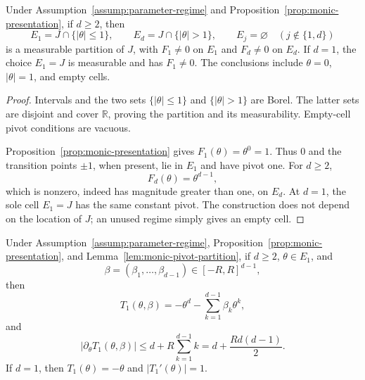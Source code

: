 \begin{lemma}
\label{lem:monic-pivot-partition}
Under Assumption~\ref{assump:parameter-regime} and
Proposition~\ref{prop:monic-presentation}, if $d\geq2$, then
\begin{equation}
E_1=J\cap\{|\theta|\leq1\},
\qquad
E_d=J\cap\{|\theta|>1\},
\qquad
E_j=\varnothing\quad(j\notin\{1,d\})
\label{eq:appendix-46}
\end{equation}
is a measurable partition of $J$, with $F_1\neq0$ on $E_1$ and
$F_d\neq0$ on $E_d$.  If $d=1$, the choice $E_1=J$ is measurable and has
$F_1\neq0$.  The conclusions include $\theta=0$, $|\theta|=1$, and empty
cells.
\end{lemma}

\begin{proof}
Intervals and the two sets $\{|\theta|\leq1\}$ and
$\{|\theta|>1\}$ are Borel.  The latter sets are disjoint and cover
$\mathbb R$, proving the partition and its measurability.  Empty-cell pivot
conditions are vacuous.

Proposition~\ref{prop:monic-presentation} gives
$F_1(\theta)=\theta^0=1$.  Thus $0$ and the transition points $\pm1$, when
present, lie in $E_1$ and have pivot one.  For $d\geq2$,
\[
F_d(\theta)=\theta^{d-1},
\]
which is nonzero, indeed has magnitude greater than one, on $E_d$.  At
$d=1$, the sole cell $E_1=J$ has the same constant pivot.  The construction
does not depend on the location of $J$; an unused regime simply gives an
empty cell.
\end{proof}

\begin{lemma}
\label{lem:monic-low-chart}
Under Assumption~\ref{assump:parameter-regime},
Proposition~\ref{prop:monic-presentation}, and
Lemma~\ref{lem:monic-pivot-partition}, if $d\geq2$,
$\theta\in E_1$, and
\[
\beta=(\beta_1,\ldots,\beta_{d-1})\in[-R,R]^{d-1},
\]
then
\begin{equation}
T_1(\theta,\beta)
=-\theta^d-\sum_{k=1}^{d-1}\beta_k\theta^k,
\label{eq:appendix-47}
\end{equation}
and
\begin{equation}
|\partial_\theta T_1(\theta,\beta)|
\leq d+R\sum_{k=1}^{d-1}k
=d+\frac{Rd(d-1)}2.
\label{eq:appendix-48}
\end{equation}
If $d=1$, then $T_1(\theta)=-\theta$ and
$|T_1'(\theta)|=1$.
\end{lemma}

